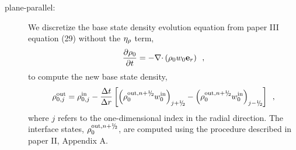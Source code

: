 \begin{enumerate}
\begin{description}
\item[plane-parallel:] We discretize the base state density evolution 
equation from paper III equation (29) without the $\eta_{\rho}$ term,
\begin{equation}
\frac{\partial \rho_0}{\partial t} = - \mathbf{\nabla} \mathbf{\cdot} \left( \rho_0 w_0 \mathbf{e}_r \right)
\enskip ,
\label{eq:rho0upd_new}
\end{equation}
to compute the new base state density,
\begin{equation}
\rho_{0,j}^{\outp} = \rho_{0,j}^{\inp} - \frac{\dt}{\dr} 
\left [ \left( \rho_0^{\outp,\nph} w_0^{\inp}\right)_{j+\myhalf} -  
         \left( \rho_0^{\outp,\nph} w_0^{\inp}\right)_{j-\myhalf} \right ]
         \nonumber \enskip,
\end{equation}
where $j$ refers to the one-dimensional index in the radial direction.
The interface states, $\rho_0^{\outp,\nph}$, are computed using the
procedure described in paper II, Appendix A.\\


\end{description}
\end{enumerate}
